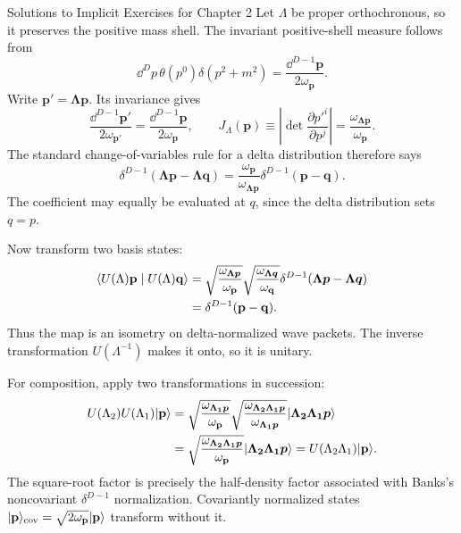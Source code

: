 \begin{bankssolutions}{Solutions to Implicit Exercises for Chapter 2}
Let $\Lambda$ be proper orthochronous, so it preserves the positive mass
shell. The invariant positive-shell measure follows from
\[
  \dd^D p\,\theta(p^0)\delta(p^2+m^2)
  =\frac{\dd^{D-1}\mathbf p}{2\omega_{\mathbf p}}.
\]
Write $\mathbf p'=\boldsymbol{\Lambda p}$. Its invariance gives
\[
  \frac{\dd^{D-1}\mathbf p'}{2\omega_{\mathbf p'}}
  =\frac{\dd^{D-1}\mathbf p}{2\omega_{\mathbf p}},
  \qquad
  J_\Lambda(\mathbf p)
  \equiv\left|\det\frac{\partial p'^i}{\partial p^j}\right|
  =\frac{\omega_{\boldsymbol{\Lambda p}}}{\omega_{\mathbf p}}.
\]
The standard change-of-variables rule for a delta distribution therefore says
\[
  \delta^{D-1}(\boldsymbol{\Lambda p}-\boldsymbol{\Lambda q})
  =\frac{\omega_{\mathbf p}}{\omega_{\boldsymbol{\Lambda p}}}
    \delta^{D-1}(\mathbf p-\mathbf q).
\]
The coefficient may equally be evaluated at $q$, since the delta distribution
sets $q=p$.

Now transform two basis states:
\begin{align*}
  \langle U(\Lambda)\mathbf p\mid U(\Lambda)\mathbf q\rangle
  &=\sqrt{\frac{\omega_{\boldsymbol{\Lambda p}}}{\omega_{\mathbf p}}}
    \sqrt{\frac{\omega_{\boldsymbol{\Lambda q}}}{\omega_{\mathbf q}}}
    \delta^{D-1}(\boldsymbol{\Lambda p}-\boldsymbol{\Lambda q})\\
  &=\delta^{D-1}(\mathbf p-\mathbf q).
\end{align*}
Thus the map is an isometry on delta-normalized wave packets. The inverse
transformation $U(\Lambda^{-1})$ makes it onto, so it is unitary.

For composition, apply two transformations in succession:
\begin{align*}
  U(\Lambda_2)U(\Lambda_1)\lvert \mathbf p\rangle
  &=\sqrt{\frac{\omega_{\boldsymbol{\Lambda_1p}}}{\omega_{\mathbf p}}}
    \sqrt{\frac{\omega_{\boldsymbol{\Lambda_2\Lambda_1p}}}
                 {\omega_{\boldsymbol{\Lambda_1p}}}}
    \lvert \boldsymbol{\Lambda_2\Lambda_1p}\rangle\\
  &=\sqrt{\frac{\omega_{\boldsymbol{\Lambda_2\Lambda_1p}}}
                 {\omega_{\mathbf p}}}
    \lvert \boldsymbol{\Lambda_2\Lambda_1p}\rangle
   =U(\Lambda_2\Lambda_1)\lvert \mathbf p\rangle.
\end{align*}
The square-root factor is precisely the half-density factor associated with
Banks's noncovariant $\delta^{D-1}$ normalization. Covariantly normalized states
$\lvert \mathbf p\rangle_{\rm cov}=\sqrt{2\omega_{\mathbf p}}\lvert \mathbf p\rangle$ transform without it.


\end{bankssolutions}
